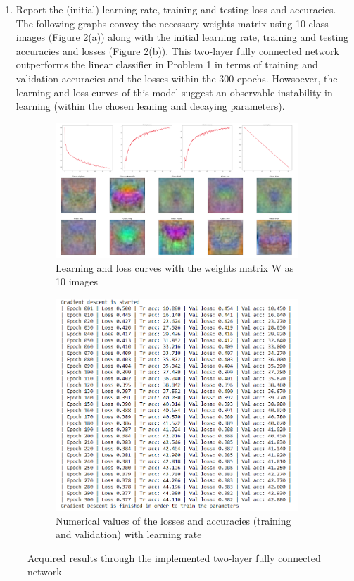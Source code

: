 \documentclass[11pt]{scrartcl}
\begin{document}
{\begin{enumerate}[label=(\alph*)]
\item Report the (initial) learning rate, training and testing loss and accuracies.
\newline The following graphs convey the necessary weights matrix using 10 class images (Figure 2(a)) along with the initial learning rate, training and testing accuracies and losses (Figure 2(b)). This two-layer fully connected network outperforms the linear classifier in Problem 1 in terms of training and validation accuracies and the losses within the 300 epochs. Howsoever, the learning and loss curves of this model suggest an observable instability in learning (within the chosen leaning and decaying parameters).
\end{enumerate}

\begin{figure}[H]
\centering
\begin{subfigure}{0.5\textwidth}
  \centering
  \includegraphics[width=.8\linewidth]{2_2.PNG}
  \caption{Learning and loss curves with the weights matrix W as 10 images}
  \label{fig:sub2}
\end{subfigure}
\begin{subfigure}{0.4\textwidth}
  \centering
  \includegraphics[width=.7\linewidth]{2_1.PNG}
  \caption{Numerical values of the losses and accuracies (training and validation) with learning rate}
  \label{fig:sub2}
\end{subfigure}
\caption{Acquired results through the implemented two-layer fully connected network}
\label{fig:test}
\end{figure}

}
\end{document}

